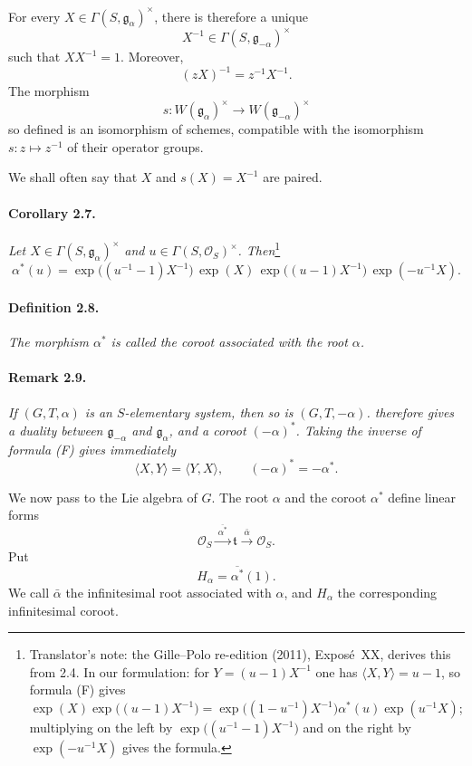 For every \(X\in\Gamma(S,\mathfrak g_\alpha)^\times\), there is
therefore a unique
\[
  X^{-1}\in\Gamma(S,\mathfrak g_{-\alpha})^\times
\]
such that \(XX^{-1}=1\). Moreover,
\[
  (zX)^{-1}=z^{-1}X^{-1}.
\]
The morphism
\[
  s\colon W(\mathfrak g_\alpha)^\times
    \longrightarrow W(\mathfrak g_{-\alpha})^\times
\]
so defined is an isomorphism of schemes, compatible with the
isomorphism \(s\colon z\mapsto z^{-1}\) of their operator groups.

We shall often say that \(X\) and \(s(X)=X^{-1}\) are paired.

\paragraph{\textbf{Corollary 2.7.}}
\emph{Let \(X\in\Gamma(S,\mathfrak g_\alpha)^\times\) and
\(u\in\Gamma(S,\mathscr O_S)^\times\). Then}\footnote{Translator's note: the Gille--Polo re-edition (2011), Exposé~XX, derives this from 2.4. In
our formulation: for \(Y=(u-1)X^{-1}\) one has \(\langle X,Y\rangle=u-1\), so formula \textup{(F)}
gives \(\exp(X)\exp\bigl((u-1)X^{-1}\bigr)
=\exp\bigl((1-u^{-1})X^{-1}\bigr)\alpha^\ast(u)\exp(u^{-1}X)\); multiplying on the left by
\(\exp\bigl((u^{-1}-1)X^{-1}\bigr)\) and on the right by \(\exp(-u^{-1}X)\) gives the formula.}
\[
  \alpha^\ast(u)
   =\exp\bigl((u^{-1}-1)X^{-1}\bigr)\,
      \exp(X)\,
      \exp\bigl((u-1)X^{-1}\bigr)\,
      \exp(-u^{-1}X).
\]

\paragraph{\textbf{Definition 2.8.}}
\emph{The morphism \(\alpha^\ast\) is called the coroot associated
with the root \(\alpha\).}

\paragraph{\textbf{Remark 2.9.}}
\emph{If \((G,T,\alpha)\) is an \(S\)-elementary system, then so
is \((G,T,-\alpha)\).  therefore gives a duality
between \(\mathfrak g_{-\alpha}\) and \(\mathfrak g_\alpha\), and
a coroot \((-\alpha)^\ast\). Taking the inverse of formula
\textup{(F)} gives immediately}
\[
  \langle X,Y\rangle=\langle Y,X\rangle,
  \qquad
  (-\alpha)^\ast=-\alpha^\ast.
\]

We now pass to the Lie algebra of \(G\). The root \(\alpha\) and
the coroot \(\alpha^\ast\) define linear forms
\[
  \mathscr O_S\xrightarrow{\ \overline{\alpha^\ast}\ }
    \mathfrak t\xrightarrow{\ \bar\alpha\ }\mathscr O_S.
\]
Put
\[
  H_\alpha=\overline{\alpha^\ast}(1).
\]
We call \(\bar\alpha\) the infinitesimal root associated with
\(\alpha\), and \(H_\alpha\) the corresponding infinitesimal
coroot.

